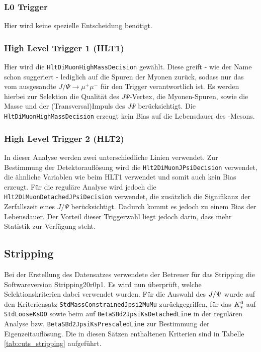 \subsubsection{L0 Trigger}
Hier wird keine spezielle Entscheidung benötigt.

\subsubsection{High Level Trigger 1 (HLT1)}
Hier wird die \texttt{HltDiMuonHighMassDecision} gewählt. Diese greift - wie der Name schon suggeriert - lediglich auf die Spuren der Myonen zurück, sodass nur das vom \Bd ausgesandte $J/\Psi \rightarrow \mu^+\mu^-$ für den Trigger verantwortlich ist. Es werden hierbei zur Selektion die Qualität des $J\Psi$-Vertex, die Myonen-Spuren, sowie die Masse und der (Transversal)Impuls des $J\Psi$ berücksichtigt. Die \texttt{HltDiMuonHighMassDecision} erzeugt kein Bias auf die Lebensdauer des \Bd-Mesons.

\subsubsection{High Level Trigger 2 (HLT2)}
In dieser Analyse werden zwei unterschiedliche Linien verwendet. Zur Bestimmung der Detektorauflösung wird die \texttt{Hlt2DiMuonJPsiDecision} verwendet, die ähnliche Variablen wie beim HLT1 verwendet und somit auch kein Bias erzeugt. Für die reguläre Analyse wird jedoch die \texttt{Hlt2DiMuonDetachedJPsiDecision} verwendet, die zusätzlich die Signifikanz der Zerfallszeit eines $J/\Psi$ berücksichtigt. Dadurch kommt es jedoch zu einem Bias der Lebensdauer. Der Vorteil dieser Triggerwahl liegt jedoch darin, dass mehr Statistik zur Verfügung steht.



\subsection{Stripping} \label{kap:stripping}
Bei der Erstellung des Datensatzes verwendete der Betreuer für das Stripping die Softwareversion Stripping20r0p1. Es wird nun überprüft, welche Selektionskriterien dabei verwendet wurden. Für die Auswahl des $J/\Psi$ wurde auf den Kriteriensatz \texttt{StdMassConstrainedJpsi2MuMu} zurückgegriffen, für das $K_s^0$ auf \texttt{StdLooseKsDD} sowie beim \Bd auf \texttt{BetaSBd2JpsiKsDetachedLine} in der regulären Analyse bzw. \texttt{BetaSBd2JpsiKsPrescaledLine} zur Bestimmung der Eigenzeitauflösung. Die in diesen Sätzen enthaltenen Kriterien sind in Tabelle \ref{tab:cuts_stripping} aufgeführt.

